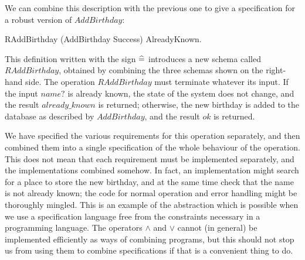 \documentclass[12pt]{article}
\begin{document}
We can combine this description with the previous one to give a
specification for a robust version of $AddBirthday$:
\begin{zed}
	RAddBirthday  (AddBirthday \land Success) \lor AlreadyKnown.
\end{zed}
This definition written with the sign $\mathrel{\widehat=}$ introduces a new
schema called $RAddBirthday$, obtained by combining the three schemas shown
on the right-hand side.
The operation $RAddBirthday$ must terminate whatever its input.
If the input $name?$ is already known, the state of the system does not
change, and the result $already\_known$ is returned; otherwise,
the new birthday is added to the
database as described by $AddBirthday$, and the result $ok$ is returned.

We have specified the various requirements for this operation separately,
and then combined them into a single specification of the whole
behaviour of the operation. This does not mean that each requirement
must be implemented separately, and the implementations combined
somehow.
In fact, an implementation might search for a place to store the new
birthday, and at the same time check that the name is not already known;
the code for normal operation and error handling might be thoroughly
mingled.
This is an example of the abstraction which is possible when we use a
specification language free from the constraints necessary
in a programming language. The operators $\land$ and $\lor$
cannot (in general) be implemented efficiently as ways of combining
programs, but this should not stop us from using them to combine
specifications if that is a convenient thing to do.
\end{document}
